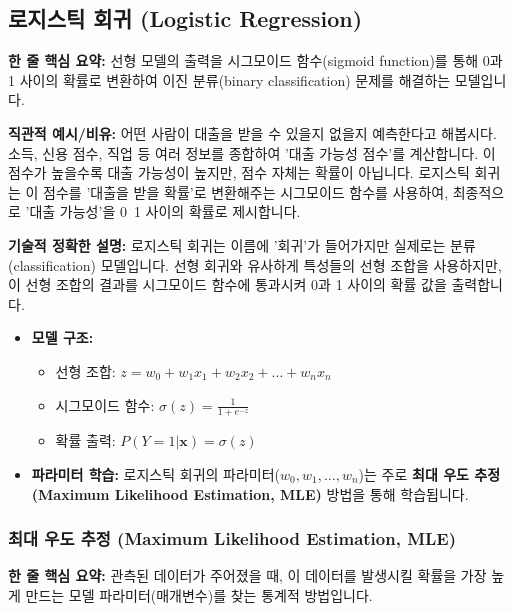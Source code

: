 \documentclass[11pt,a4paper]{article}
\begin{document}
\newpage
\subsection{로지스틱 회귀 (Logistic Regression)}

\begin{conceptbox}
\textbf{한 줄 핵심 요약:} 선형 모델의 출력을 시그모이드 함수(sigmoid function)를 통해 0과 1 사이의 확률로 변환하여 이진 분류(binary classification) 문제를 해결하는 모델입니다.
\end{conceptbox}

\textbf{직관적 예시/비유:}
어떤 사람이 대출을 받을 수 있을지 없을지 예측한다고 해봅시다. 소득, 신용 점수, 직업 등 여러 정보를 종합하여 '대출 가능성 점수'를 계산합니다. 이 점수가 높을수록 대출 가능성이 높지만, 점수 자체는 확률이 아닙니다. 로지스틱 회귀는 이 점수를 '대출을 받을 확률'로 변환해주는 시그모이드 함수를 사용하여, 최종적으로 '대출 가능성'을 0~1 사이의 확률로 제시합니다.

\textbf{기술적 정확한 설명:}
로지스틱 회귀는 이름에 '회귀'가 들어가지만 실제로는 분류(classification) 모델입니다. 선형 회귀와 유사하게 특성들의 선형 조합을 사용하지만, 이 선형 조합의 결과를 시그모이드 함수에 통과시켜 0과 1 사이의 확률 값을 출력합니다.

\begin{itemize}
    \item \textbf{모델 구조:}
        \begin{itemize}
            \item 선형 조합: $z = w_0 + w_1x_1 + w_2x_2 + \dots + w_nx_n$
            \item 시그모이드 함수: $\sigma(z) = \frac{1}{1 + e^{-z}}$
            \item 확률 출력: $P(Y=1|\mathbf{x}) = \sigma(z)$
        \end{itemize}
    \item \textbf{파라미터 학습:} 로지스틱 회귀의 파라미터($w_0, w_1, \dots, w_n$)는 주로 \textbf{최대 우도 추정(Maximum Likelihood Estimation, MLE)} 방법을 통해 학습됩니다.
\end{itemize}

\subsubsection*{최대 우도 추정 (Maximum Likelihood Estimation, MLE)}

\begin{conceptbox}
\textbf{한 줄 핵심 요약:} 관측된 데이터가 주어졌을 때, 이 데이터를 발생시킬 확률을 가장 높게 만드는 모델 파라미터(매개변수)를 찾는 통계적 방법입니다.
\end{conceptbox}
\end{document}
